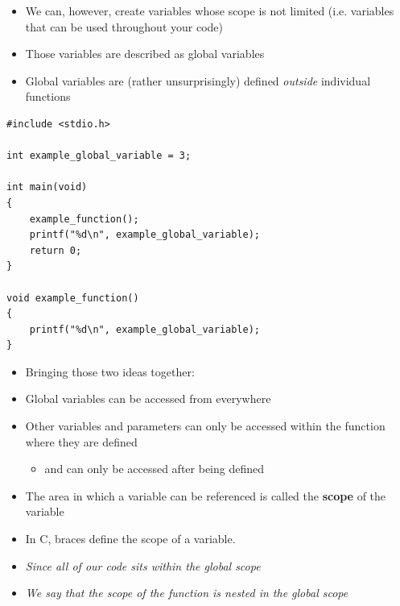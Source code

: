 \documentclass{beamer}
\begin{document}
\begin{frame}[fragile]
\begin{itemize}
\item We can, however, create variables whose scope is not limited (i.e. variables that can be used throughout your code) 
\item Those variables are described as global variables
\item Global variables are (rather unsurprisingly) defined \textit{outside }individual functions 
\end{itemize}
\end{frame}

\begin{frame}[fragile]
\begin{block}{}
\begin{lstlisting}
#include <stdio.h>

int example_global_variable = 3;

int main(void) 
{
    example_function();
    printf("%d\n", example_global_variable);
    return 0;
}

void example_function()
{
    printf("%d\n", example_global_variable);
}

\end{lstlisting}
\end{block}
\end{frame}

\begin{frame}
\begin{itemize}
\item Bringing those two ideas together: 
\bigskip
\item Global variables can be accessed from everywhere 
\item Other variables and parameters can only be accessed within the function where they are defined
\begin{itemize}
\item and can only be accessed after being defined
\end{itemize}
\item The area in which a variable can be referenced is called the \textbf{scope} of the variable 
\item In C, braces define the scope of a variable. 
\bigskip
\item {\itshape Since all of our code sits within the global scope }
\item {\itshape We say that the scope of the function is nested in the global scope }
\end{itemize}
\end{frame}
\end{document}
